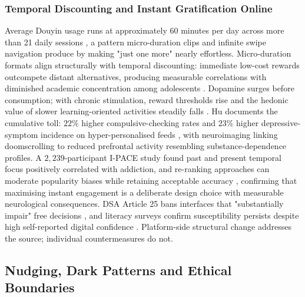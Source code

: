 \documentclass[11pt]{article}
\begin{document}
\subsubsection{Temporal Discounting and Instant Gratification Online}
\label{sec:temporal_discounting_instant_gratification} Average Douyin usage runs at approximately 60 minutes per day across more than 21 daily sessions \parencites[3]{8958037}, a pattern micro-duration clips and infinite swipe navigation produce by making "just one more" nearly effortless. Micro-duration formats align structurally with temporal discounting: immediate low-cost rewards outcompete distant alternatives, producing measurable correlations with diminished academic concentration among adolescents \parencites[2]{8958037}[3]{8958037}. Dopamine surges before consumption; with chronic stimulation, reward thresholds rise and the hedonic value of slower learning-oriented activities steadily falls \parencites[4]{8958037}. Hu documents the cumulative toll: $22\%$ higher compulsive-checking rates and $23\%$ higher depressive-symptom incidence on hyper-personalised feeds \parencites[2]{3303310}[20]{3303310}, with neuroimaging linking doomscrolling to reduced prefrontal activity resembling substance-dependence profiles. A $2{,}239$-participant I-PACE study found past and present temporal focus positively correlated with addiction, and re-ranking approaches can moderate popularity biases while retaining acceptable accuracy \parencites[3]{9051044}, confirming that maximising instant engagement is a deliberate design choice with measurable neurological consequences. DSA Article 25 bans interfaces that "substantially impair" free decisions \parencites[20]{6941611}[2]{8958037}, and literacy surveys confirm susceptibility persists despite high self-reported digital confidence \parencites[31]{9360054}. Platform-side structural change \parencites[99]{2977039} addresses the source; individual countermeasures do not.

\subsection{Nudging, Dark Patterns and Ethical Boundaries}
\end{document}
